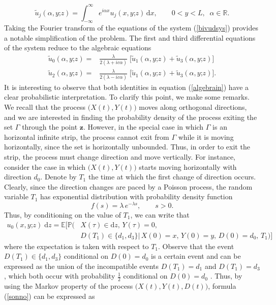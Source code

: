 \documentclass{article}
\begin{document}
$$\widetilde{u}_j(\alpha,y\mathord{;}z)=\int_{-\infty}^{\infty}e^{i\alpha x}u_j(x,y\mathord{;}z)\,\mathrm{d}x,\qquad 0<y<L,\;\;\alpha\in\mathbb{R}.$$
Taking the Fourier transform of the equations of the system (\ref{bivudsys}) provides a notable simplification of the problem. The first and third differential equations of the system reduce to the algebraic equations 
\begin{equation}\label{algebrain}
\begin{aligned}
\widetilde{u}_0(\alpha,y\mathord{;}z)=&\frac{\lambda}{2(\lambda+ic\alpha)}\;\big[\widetilde{u}_1(\alpha,y\mathord{;}z)+\widetilde{u}_3(\alpha,y\mathord{;}z)\big]\\
\widetilde{u}_2(\alpha,y\mathord{;}z)=&\frac{\lambda}{2(\lambda-ic\alpha)}\;\big[\widetilde{u}_1(\alpha,y\mathord{;}z)+\widetilde{u}_3(\alpha,y\mathord{;}z)\big].
\end{aligned}
\end{equation}
It is interesting to observe that both identities in equation (\ref{algebrain}) have a clear probabilistic interpretation. To clarify this point, we make some remarks. We recall that the process $\big(X(t),Y(t)\big)$ moves along orthogonal directions, and we are interested in finding the probability density of the process exiting the set $\Gamma$ through the point $\mathbf{z}$. However, in the special case in which $\Gamma$ is an horizontal infinite strip, the process cannot exit from $\Gamma$ while it is moving horizontally, since the set is horizontally unbounded. Thus, in order to exit the strip, the process must change direction and move vertically. For instance, consider the case in which $\big(X(t),Y(t)\big)$ starts moving horizontally with direction $d_0$. Denote by $T_1$ the time at which the first change of direction occurs. Clearly, since the direction changes are paced by a Poisson process, the random variable $T_1$ has exponential distribution with probability density function 
$$f(s)=\lambda\,e^{-\lambda s},\qquad s>0.$$
 Thus, by conditioning on the value of $T_1$, we can write that
\begin{align}u_0(x,y\mathord{;}z)\;\mathrm{d}z=\mathbb{E}\Big[\mathbb{P}\Big(&X(\tau)\in\mathrm{d}z,\,Y(\tau)=0,\nonumber\\
&D(T_1)\in\{d_1,d_3\}\Big\lvert\,X(0)=x,\,Y(0)=y,\,D(0)=d_0,\,T_1\Big)\Big]\label{sonno}
\end{align}
where the expectation is taken with respect to $T_1$. Observe that the event $D(T_1)\in\{d_1,d_3\}$ conditional on $D(0)=d_0$ is a certain event and can be expressed as the union of the incompatible events $D(T_1)=d_1$ and $D(T_1)=d_3$, which both occur with probability $\frac{1}{2}$ conditional on $D(0)=d_0$ . Thus, by using the Markov property of the process $\big(X(t),Y(t),D(t)\big)$, formula (\ref{sonno}) can be expressed as
\end{document}
